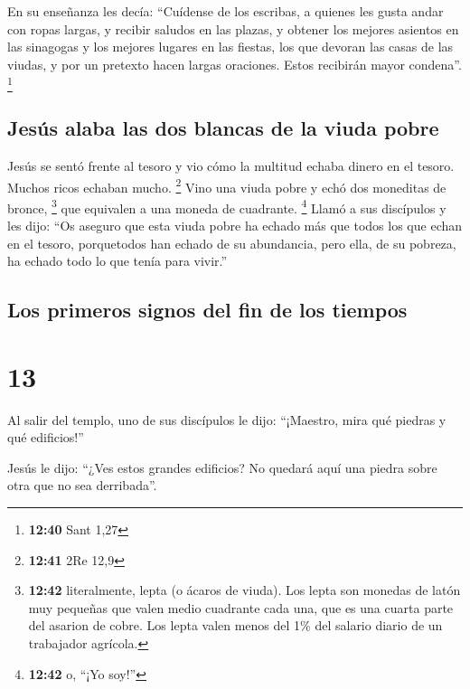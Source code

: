  En su enseñanza les decía: ``Cuídense de los escribas, a
quienes les gusta andar con ropas largas, y recibir saludos en las
plazas,  y obtener los mejores asientos en las sinagogas
y los mejores lugares en las fiestas,  los que devoran
las casas de las viudas, y por un pretexto hacen largas oraciones. Estos
recibirán mayor condena''. \footnote{\textbf{12:40} Sant 1,27}

\hypertarget{jesuxfas-alaba-las-dos-blancas-de-la-viuda-pobre}{%
\subsection{Jesús alaba las dos blancas de la viuda
pobre}\label{jesuxfas-alaba-las-dos-blancas-de-la-viuda-pobre}}

 Jesús se sentó frente al tesoro y vio cómo la multitud
echaba dinero en el tesoro. Muchos ricos echaban mucho. \footnote{\textbf{12:41}
  2Re 12,9}  Vino una viuda pobre y echó dos moneditas de
bronce, \footnote{\textbf{12:42} literalmente, lepta (o ácaros de
  viuda). Los lepta son monedas de latón muy pequeñas que valen medio
  cuadrante cada una, que es una cuarta parte del asarion de cobre. Los
  lepta valen menos del 1\% del salario diario de un trabajador
  agrícola.} que equivalen a una moneda de cuadrante. \footnote{\textbf{12:42}
  o, ``¡Yo soy!''}  Llamó a sus discípulos y les dijo:
``Os aseguro que esta viuda pobre ha echado más que todos los que echan
en el tesoro,  porquetodos han echado de su abundancia,
pero ella, de su pobreza, ha echado todo lo que tenía para vivir.''

\hypertarget{los-primeros-signos-del-fin-de-los-tiempos}{%
\subsection{Los primeros signos del fin de los
tiempos}\label{los-primeros-signos-del-fin-de-los-tiempos}}

\hypertarget{section-12}{%
\section{13}\label{section-12}}

 Al salir del templo, uno de sus discípulos le dijo:
``¡Maestro, mira qué piedras y qué edificios!''

 Jesús le dijo: ``¿Ves estos grandes edificios? No quedará
aquí una piedra sobre otra que no sea derribada''.

